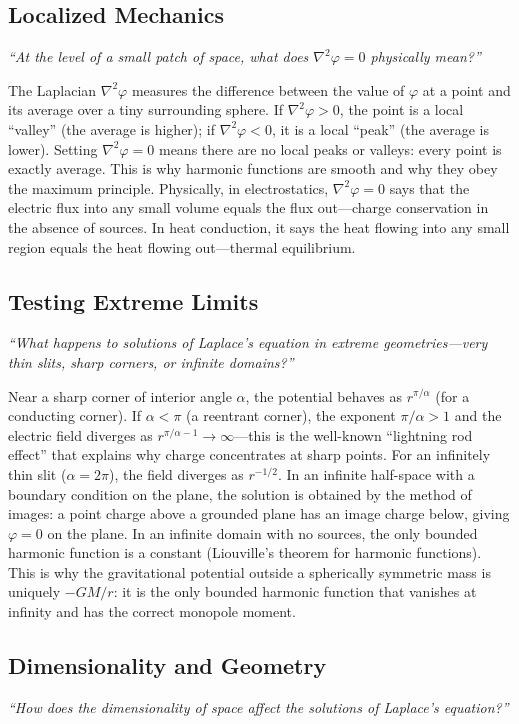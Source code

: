 \subsection*{Localized Mechanics}
\textit{``At the level of a small patch of space, what does $\nabla^{2}\varphi = 0$ physically mean?''}

The Laplacian $\nabla^{2}\varphi$ measures the difference between the value of $\varphi$ at a point and its average over a tiny surrounding sphere. If $\nabla^{2}\varphi > 0$, the point is a local ``valley'' (the average is higher); if $\nabla^{2}\varphi < 0$, it is a local ``peak'' (the average is lower). Setting $\nabla^{2}\varphi = 0$ means there are no local peaks or valleys: every point is exactly average. This is why harmonic functions are smooth and why they obey the maximum principle. Physically, in electrostatics, $\nabla^{2}\varphi = 0$ says that the electric flux into any small volume equals the flux out---charge conservation in the absence of sources. In heat conduction, it says the heat flowing into any small region equals the heat flowing out---thermal equilibrium.

\subsection*{Testing Extreme Limits}
\textit{``What happens to solutions of Laplace's equation in extreme geometries---very thin slits, sharp corners, or infinite domains?''}

Near a sharp corner of interior angle $\alpha$, the potential behaves as $r^{\pi/\alpha}$ (for a conducting corner). If $\alpha < \pi$ (a reentrant corner), the exponent $\pi/\alpha > 1$ and the electric field diverges as $r^{\pi/\alpha - 1} \to \infty$---this is the well-known ``lightning rod effect'' that explains why charge concentrates at sharp points. For an infinitely thin slit ($\alpha = 2\pi$), the field diverges as $r^{-1/2}$. In an infinite half-space with a boundary condition on the plane, the solution is obtained by the method of images: a point charge above a grounded plane has an image charge below, giving $\varphi = 0$ on the plane. In an infinite domain with no sources, the only bounded harmonic function is a constant (Liouville's theorem for harmonic functions). This is why the gravitational potential outside a spherically symmetric mass is uniquely $-GM/r$: it is the only bounded harmonic function that vanishes at infinity and has the correct monopole moment.

\subsection*{Dimensionality and Geometry}
\textit{``How does the dimensionality of space affect the solutions of Laplace's equation?''}

